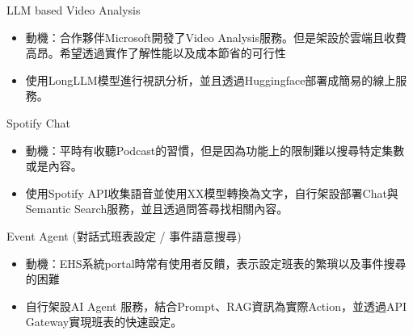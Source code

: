 

\begin{cventries}


  \cventrynotitle
    {
      \begin{cvitems} %
        \item {LLM based Video Analysis}
        \begin{itemize}
            \item {動機：合作夥伴Microsoft開發了Video Analysis服務。但是架設於雲端且收費高昂。希望透過實作了解性能以及成本節省的可行性}
            \item {使用LongLLM模型進行視訊分析，並且透過Huggingface部署成簡易的線上服務。}
        \end{itemize}
        \item {Spotify Chat}
        \begin{itemize}
            \item {動機：平時有收聽Podcast的習慣，但是因為功能上的限制難以搜尋特定集數或是內容。}
            \item {使用Spotify API收集語音並使用XX模型轉換為文字，自行架設部署Chat與Semantic Search服務，並且透過問答尋找相關內容。}
        \end{itemize}
        \item {Event Agent (對話式班表設定 / 事件語意搜尋)}
        \begin{itemize}
            \item {動機：EHS系統portal時常有使用者反饋，表示設定班表的繁瑣以及事件搜尋的困難}
            \item {自行架設AI Agent 服務，結合Prompt、RAG資訊為實際Action，並透過API Gateway實現班表的快速設定。}
        \end{itemize}
      \end{cvitems}
    }
    



\end{cventries}
